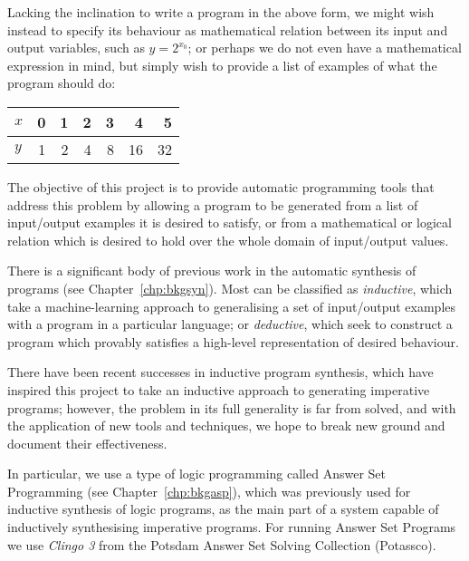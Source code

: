\documentclass[a4paper,twoside,notitlepage]{report}
\begin{document}
Lacking the inclination to write a program in the above form, we might 
wish instead to specify its behaviour as mathematical relation between 
its input and output variables, such as $y = 2^{x_0}$; or perhaps we do not 
even have a mathematical expression in mind, but simply wish to provide a 
list of examples of what the program should do:
\begin{center}
\begin{tabular}{| l || r | r | r | r | r | r |}
    \hline
    $x$ & 0 & 1 & 2 & 3 & 4  &  5 \\
    \hline
    $y$ & 1 & 2 & 4 & 8 & 16 & 32 \\
    \hline
\end{tabular}
\end{center}

The objective of this project is to provide automatic programming tools 
that address this problem by allowing a program to be generated from a 
list of input/output examples it is desired to satisfy, or from a 
mathematical or logical relation which is desired to hold over the whole 
domain of input/output values.

There is a significant body of previous work in the automatic synthesis of 
programs (see Chapter~\ref{chp:bkgsyn}). Most can be classified as 
\emph{inductive}, which take a machine-learning approach to generalising a set 
of input/output examples with a program in a particular language; or 
\emph{deductive}\cite{cheatham86}\cite{bundy90}\cite{colon05}, which seek to 
construct a program which provably satisfies a high-level representation of 
desired behaviour.

There have been recent successes in inductive program synthesis\cite{tds}, 
which have inspired this project to take an inductive approach to generating 
imperative programs; however, the problem in its full generality is far from 
solved, and with the application of new tools and techniques, we hope to break 
new ground and document their effectiveness.

In particular, we use a type of logic programming called Answer Set 
Programming (see Chapter~\ref{chp:bkgasp}), which was previously used for 
inductive synthesis of logic programs, as the main part of a system 
capable of inductively synthesising imperative programs. For running 
Answer Set Programs we use \emph{Clingo 3} from the Potsdam Answer Set 
Solving Collection (Potassco)\cite{potassco}.
\end{document}
